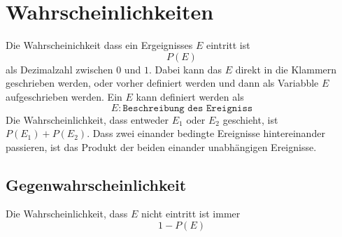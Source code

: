 \documentclass{article}
\begin{document}
 
\section{Wahrscheinlichkeiten} 
Die Wahrscheinichkeit dass ein Ergeignisses $E$ eintritt ist
\[
 P(E) 
\]
als Dezimalzahl zwischen $0$ und $1$. Dabei kann das $E$ direkt in die Klammern geschrieben werden, oder vorher definiert werden und dann als Variabble $E$ aufgeschrieben werden. Ein $E$ kann definiert werden als
\[
 E : \texttt{Beschreibung des Ereigniss} 
\]
Die Wahrscheinlichkeit, dass entweder $E_1$ oder $E_2$ geschieht, ist $P(E_1) + P(E_2)$. Dass zwei einander bedingte Ereignisse hintereinander passieren, ist das Produkt der beiden einander unabhängigen Ereignisse.
 
\subsection{Gegenwahrscheinlichkeit}
Die Wahrscheinlichkeit, dass $E$ nicht eintritt ist immer
\[
 1 - P(E) 
\] 
 
\end{document}
